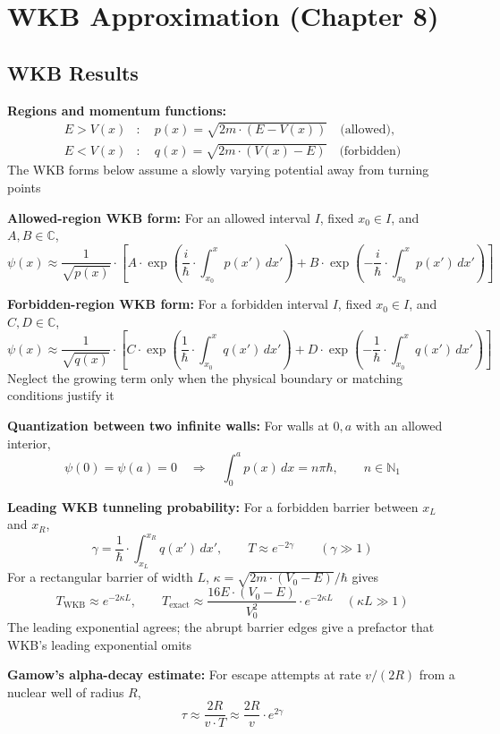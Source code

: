 \documentclass[12pt]{article}
\begin{document}
\section{WKB Approximation (Chapter 8)}

\subsection{WKB Results}

\textbf{Regions and momentum functions:}
\[
  \begin{aligned}
    E>V(x)&:\quad p(x)=\sqrt{2m\cdot(E-V(x))}\quad\text{(allowed)},\\
    E<V(x)&:\quad q(x)=\sqrt{2m\cdot(V(x)-E)}\quad\text{(forbidden)}
  \end{aligned}
\]
The WKB forms below assume a slowly varying potential away from turning points

\textbf{Allowed-region WKB form:}
For an allowed interval $I$, fixed $x_0\in I$, and $A,B\in\mathbb C$,
\[
  \psi(x)\approx\frac1{\sqrt{p(x)}}\cdot\left[
    A\cdot\exp\left(\frac{i}{\hbar}\cdot
      \int_{x_0}^{x}p(x')\,dx'\right)
    +B\cdot\exp\left(-\frac{i}{\hbar}\cdot
      \int_{x_0}^{x}p(x')\,dx'\right)\right]
\]

\textbf{Forbidden-region WKB form:}
For a forbidden interval $I$, fixed $x_0\in I$, and $C,D\in\mathbb C$,
\[
  \psi(x)\approx\frac1{\sqrt{q(x)}}\cdot\left[
    C\cdot\exp\left(\frac1\hbar\cdot
      \int_{x_0}^{x}q(x')\,dx'\right)
    +D\cdot\exp\left(-\frac1\hbar\cdot
      \int_{x_0}^{x}q(x')\,dx'\right)\right]
\]
Neglect the growing term only when the physical boundary or matching conditions justify it

\textbf{Quantization between two infinite walls:}
For walls at $0,a$ with an allowed interior,
\[
  \psi(0)=\psi(a)=0
  \quad\Longrightarrow\quad
  \int_0^a p(x)\,dx=n\pi\hbar,
  \qquad n\in\mathbb N_1
\]

\textbf{Leading WKB tunneling probability:}
For a forbidden barrier between $x_L$ and $x_R$,
\[
  \gamma=\frac1\hbar\cdot\int_{x_L}^{x_R}q(x')\,dx',
  \qquad T\approx e^{-2\gamma}\qquad(\gamma\gg1)
\]
For a rectangular barrier of width $L$, $\kappa=\sqrt{2m\cdot(V_0-E)}/\hbar$ gives
\[
  T_{\mathrm{WKB}}\approx e^{-2\kappa L},\qquad
  T_{\mathrm{exact}}\approx\frac{16E\cdot(V_0-E)}{V_0^2}\cdot e^{-2\kappa L}
  \quad(\kappa L\gg1)
\]
The leading exponential agrees; the abrupt barrier edges give a prefactor that WKB's leading exponential omits

\textbf{Gamow's alpha-decay estimate:}
For escape attempts at rate $v/(2R)$ from a nuclear well of radius $R$,
\[
  \tau\approx\frac{2R}{v\cdot T}
  \approx\frac{2R}{v}\cdot e^{2\gamma}
\]
\end{document}
